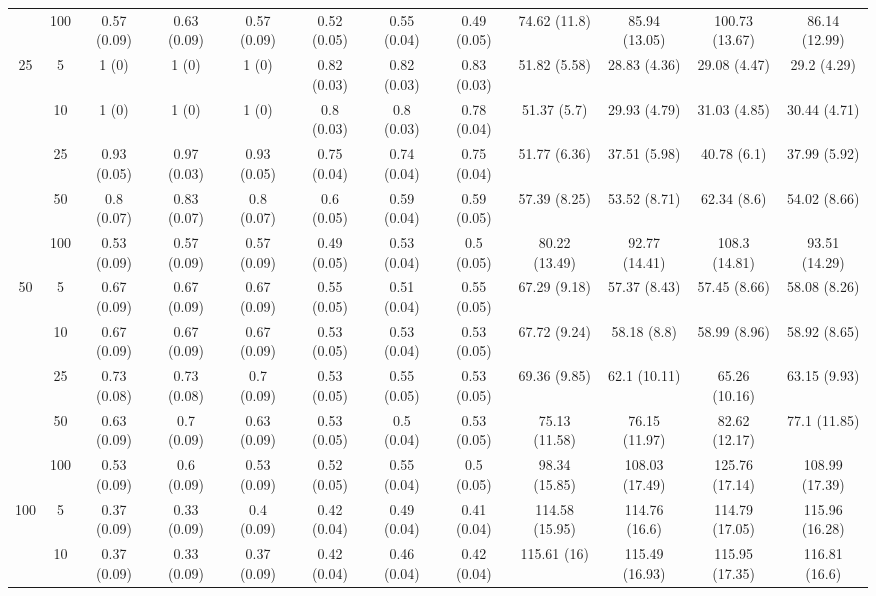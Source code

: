\documentclass[11pt]{article}
\theoremstyle{definition}
\begin{document}
\begin{table}[H]
\begin{center}
{\begin{tabular}{cc|ccc|ccc|cccc|}
    & 100  & 0.57 (0.09) & 0.63 (0.09) & 0.57 (0.09) & 0.52 (0.05) & 0.55 (0.04) & 0.49 (0.05) & 74.62 (11.8) & 85.94 (13.05) & 100.73 (13.67) & 86.14 (12.99) \\[.3cm] 
   \multirow{5}{*}{25} & 5  & 1 (0) & 1 (0) & 1 (0) & 0.82 (0.03) & 0.82 (0.03) & 0.83 (0.03) & 51.82 (5.58) & 28.83 (4.36) & 29.08 (4.47) & 29.2 (4.29) \\ 
    & 10  & 1 (0) & 1 (0) & 1 (0) & 0.8 (0.03) & 0.8 (0.03) & 0.78 (0.04) & 51.37 (5.7) & 29.93 (4.79) & 31.03 (4.85) & 30.44 (4.71) \\ 
    & 25  & 0.93 (0.05) & 0.97 (0.03) & 0.93 (0.05) & 0.75 (0.04) & 0.74 (0.04) & 0.75 (0.04) & 51.77 (6.36) & 37.51 (5.98) & 40.78 (6.1) & 37.99 (5.92) \\ 
    & 50  & 0.8 (0.07) & 0.83 (0.07) & 0.8 (0.07) & 0.6 (0.05) & 0.59 (0.04) & 0.59 (0.05) & 57.39 (8.25) & 53.52 (8.71) & 62.34 (8.6) & 54.02 (8.66) \\ 
    & 100  & 0.53 (0.09) & 0.57 (0.09) & 0.57 (0.09) & 0.49 (0.05) & 0.53 (0.04) & 0.5 (0.05) & 80.22 (13.49) & 92.77 (14.41) & 108.3 (14.81) & 93.51 (14.29) \\[.3cm] 
   \multirow{5}{*}{50} & 5  & 0.67 (0.09) & 0.67 (0.09) & 0.67 (0.09) & 0.55 (0.05) & 0.51 (0.04) & 0.55 (0.05) & 67.29 (9.18) & 57.37 (8.43) & 57.45 (8.66) & 58.08 (8.26) \\ 
    & 10  & 0.67 (0.09) & 0.67 (0.09) & 0.67 (0.09) & 0.53 (0.05) & 0.53 (0.04) & 0.53 (0.05) & 67.72 (9.24) & 58.18 (8.8) & 58.99 (8.96) & 58.92 (8.65) \\ 
    & 25  & 0.73 (0.08) & 0.73 (0.08) & 0.7 (0.09) & 0.53 (0.05) & 0.55 (0.05) & 0.53 (0.05) & 69.36 (9.85) & 62.1 (10.11) & 65.26 (10.16) & 63.15 (9.93) \\ 
    & 50  & 0.63 (0.09) & 0.7 (0.09) & 0.63 (0.09) & 0.53 (0.05) & 0.5 (0.04) & 0.53 (0.05) & 75.13 (11.58) & 76.15 (11.97) & 82.62 (12.17) & 77.1 (11.85) \\ 
    & 100  & 0.53 (0.09) & 0.6 (0.09) & 0.53 (0.09) & 0.52 (0.05) & 0.55 (0.04) & 0.5 (0.05) & 98.34 (15.85) & 108.03 (17.49) & 125.76 (17.14) & 108.99 (17.39)\\[.3cm] 
   \multirow{5}{*}{100} & 5  & 0.37 (0.09) & 0.33 (0.09) & 0.4 (0.09) & 0.42 (0.04) & 0.49 (0.04) & 0.41 (0.04) & 114.58 (15.95) & 114.76 (16.6) & 114.79 (17.05) & 115.96 (16.28) \\ 
    & 10  & 0.37 (0.09) & 0.33 (0.09) & 0.37 (0.09) & 0.42 (0.04) & 0.46 (0.04) & 0.42 (0.04) & 115.61 (16) & 115.49 (16.93) & 115.95 (17.35) & 116.81 (16.6) \\ 

\end{tabular}}
\end{center}
\end{table}
\end{document}
